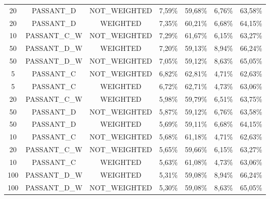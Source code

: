 \begin{table}[H]
{\begin{tabular}{ccccccc}
			20 &  PASSANT\_D & NOT\_WEIGHTED &     7,59\% &    59,68\% &     6,76\% &    63,58\% \\
			
			20 &  PASSANT\_D &   WEIGHTED &     7,35\% &    60,21\% &     6,68\% &    64,15\% \\
			
			10 & PASSANT\_C\_W & NOT\_WEIGHTED &     7,29\% &    61,67\% &     6,15\% &    63,27\% \\
			
			50 & PASSANT\_D\_W &   WEIGHTED &     7,20\% &    59,13\% &     8,94\% &    66,24\% \\
			
			50 & PASSANT\_D\_W & NOT\_WEIGHTED &     7,05\% &    59,12\% &     8,63\% &    65,05\% \\
			
			5 &  PASSANT\_C & NOT\_WEIGHTED &     6,82\% &    62,81\% &     4,71\% &    62,63\% \\
			
			5 &  PASSANT\_C &   WEIGHTED &     6,72\% &    62,71\% &     4,73\% &    63,06\% \\
			
			20 & PASSANT\_C\_W &   WEIGHTED &     5,98\% &    59,79\% &     6,51\% &    63,75\% \\
			
			50 &  PASSANT\_D & NOT\_WEIGHTED &     5,87\% &    59,12\% &     6,76\% &    63,58\% \\
			
			50 &  PASSANT\_D &   WEIGHTED &     5,69\% &    59,11\% &     6,68\% &    64,15\% \\
			
			10 &  PASSANT\_C & NOT\_WEIGHTED &     5,68\% &    61,18\% &     4,71\% &    62,63\% \\
			
			20 & PASSANT\_C\_W & NOT\_WEIGHTED &     5,65\% &    59,66\% &     6,15\% &    63,27\% \\
			
			10 &  PASSANT\_C &   WEIGHTED &     5,63\% &    61,08\% &     4,73\% &    63,06\% \\
			
			100 & PASSANT\_D\_W &   WEIGHTED &     5,31\% &    59,08\% &     8,94\% &    66,24\% \\
			
			100 & PASSANT\_D\_W & NOT\_WEIGHTED &     5,30\% &    59,08\% &     8,63\% &    65,05\% \\
			

\end{tabular}}
\end{table}
